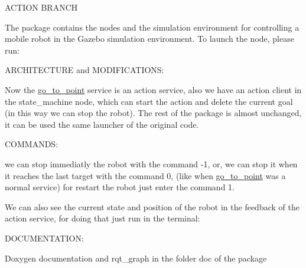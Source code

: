 A\+C\+T\+I\+ON B\+R\+A\+N\+CH

The package contains the nodes and the simulation environment for controlling a mobile robot in the Gazebo simulation environment. To launch the node, please run\+: 
\begin{DoxyCode}{0}
\end{DoxyCode}


A\+R\+C\+H\+I\+T\+E\+C\+T\+U\+RE and M\+O\+D\+I\+F\+I\+C\+A\+T\+I\+O\+NS\+:

Now the \mbox{\hyperlink{namespacego__to__point}{go\+\_\+to\+\_\+point}} service is an action service, also we have an action client in the state\+\_\+machine node, which can start the action and delete the current goal (in this way we can stop the robot). The rest of the package is almost unchanged, it can be used the same launcher of the original code.

C\+O\+M\+M\+A\+N\+DS\+:

we can stop immediatly the robot with the command -\/1, or, we can stop it when it reaches the last target with the command 0, (like when \mbox{\hyperlink{namespacego__to__point}{go\+\_\+to\+\_\+point}} was a normal service) for restart the robot just enter the command 1.

We can also see the current state and position of the robot in the feedback of the action service, for doing that just run in the terminal\+: 
\begin{DoxyCode}{0}
\end{DoxyCode}


D\+O\+C\+U\+M\+E\+N\+T\+A\+T\+I\+ON\+:

Doxygen documentation and rqt\+\_\+graph in the folder doc of the package 